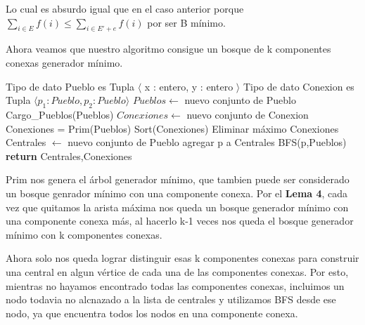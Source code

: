 Lo cual es absurdo igual que en el caso anterior porque $\sum_{i \in E} f(i) \leq \sum_{i \in E'+e} f(i)$ por ser B mínimo.

Ahora veamos que nuestro algoritmo consigue un bosque de k componentes conexas generador mínimo.

\begin{center}
\begin{pseudo}
\State Tipo de dato Pueblo es Tupla $\langle$ x : entero, y : entero $\rangle$
\State Tipo de dato Conexion es Tupla $\langle p_1 : Pueblo, p_2 : Pueblo \rangle$
        \State $Pueblos \leftarrow$ nuevo conjunto de Pueblo 
        \State Cargo\_Pueblos(Pueblos) 
        \State $Conexiones \leftarrow$ nuevo conjunto de Conexion 
        \State Conexiones = Prim(Pueblos) 
        \State Sort(Conexiones) 
         
	  \State Eliminar máximo Conexiones 
	\EndFor
        \State Centrales $\leftarrow$ nuevo conjunto de Pueblo 
        \State agregar p a Centrales
        \State BFS(p,Pueblos)
        \EndWhile
        \State \textbf{return} Centrales,Conexiones 
    \EndProcedure
\end{pseudo}
\end{center}

Prim nos genera el árbol generador mínimo, que tambien puede ser considerado un bosque genrador mínimo con una componente conexa. Por el \textbf{Lema 4}, cada vez que quitamos la arista máxima nos queda un bosque generador mínimo con una componente conexa más, al hacerlo k-1 veces nos queda el bosque generador mínimo con k componentes conexas.

Ahora solo nos queda lograr distinguir esas k componentes conexas para construir una central en algun vértice de cada una de las componentes conexas. Por esto, mientras no hayamos encontrado todas las componentes conexas, incluimos un nodo todavia no alcnazado a la lista de centrales y utilizamos BFS desde ese nodo, ya que encuentra todos los nodos en una componente conexa.
